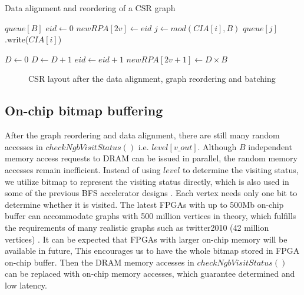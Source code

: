 \vspace{-0.5em}
\begin{algorithm}
	\caption{Data alignment and reordering of a CSR graph} \label{alg:mem-coalescing}
    \footnotesize
	\begin{algorithmic}[1]
		\State $queue[B]$
		\State $eid \gets 0$
		\State $newRPA[2v] \gets eid$
		\State $j \gets mod(CIA[i],B)$
		\State $queue[j]$.write($CIA[i]$)
		\EndFor

		\State $D \gets 0$
		\State $D \gets D + 1$
		\State $eid \gets eid + 1$
		\Else 
		\EndIf
		\EndFor
		\EndWhile	
		\State $newRPA[2v + 1] \gets D \times B$
		\EndFor

	\end{algorithmic}
\end{algorithm}
\vspace{-0.5em}


\begin{figure}
    \caption{CSR layout after the data alignment, graph reordering and batching}
\label{fig:graph-reorder}
\vspace{-1.5em}
\end{figure}

\subsection{On-chip bitmap buffering}
After the graph reordering and data alignment, there are still many random accesses
in $checkNgbVisitStatus()$ i.e. $level[v\_out]$. Although $B$ independent memory
access requests to DRAM can be issued in parallel, the random memory accesses
remain inefficient. Instead of using $level$ to determine the visiting status,
we utilize bitmap to represent the visiting status directly, which is also used in
some of the previous BFS accelerator designs \cite{gautier2016spector}.
Each vertex needs only one bit to determine whether it is visited.
The latest FPGAs with up to 500Mb on-chip buffer \cite{xilinxFPGA} can accommodate
graphs with 500 million vertices in theory, which fulfills the
requirements of many realistic graphs such as twitter2010
(42 million vertices) \cite{boldi2011layered}. It can be expected that
FPGAs with larger on-chip memory will be available in future,
This encourages us to have the whole bitmap stored in FPGA on-chip buffer.
Then the DRAM memory accesses in $checkNgbVisitStatus()$ can be replaced
with on-chip memory accesses, which guarantee determined
and low latency.

